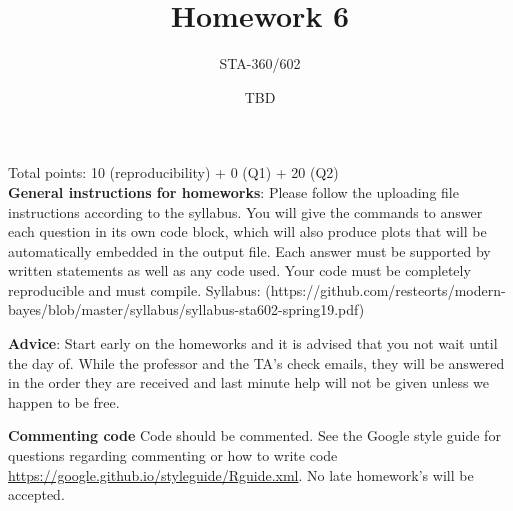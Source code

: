 \documentclass{article}
\begin{document}
\title{Homework 6}
\author{STA-360/602}
\date{TBD}
\maketitle

Total points: 10 (reproducibility) + 0 (Q1) + 20 (Q2)\\

\textbf{General instructions for homeworks}: Please follow the uploading file instructions according to the syllabus. You will give the commands to answer each question in its own code block, which will also produce plots that will be automatically embedded in the output file. Each answer must be supported by written statements as well as any code used. Your code must be completely reproducible and must compile. Syllabus: (https://github.com/resteorts/modern-bayes/blob/master/syllabus/syllabus-sta602-spring19.pdf)

\textbf{Advice}: Start early on the homeworks and it is advised that you not wait until the day of. While the professor and the TA's check emails, they will be answered in the order they are received and last minute help will not be given unless we happen to be free.  

\textbf{Commenting code}
Code should be commented. See the Google style guide for questions regarding commenting or how to write 
code \url{https://google.github.io/styleguide/Rguide.xml}. No late homework's will be accepted.
\end{document}
